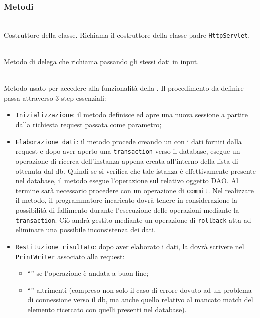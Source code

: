 \subsubsection*{Metodi}
\begin{description}
	\item{}\\
	Costruttore della classe. Richiama il costruttore della classe padre \texttt{HttpServlet}.
	
	\item{}\\
	Metodo di delega che richiama  passando gli stessi dati in input.
	
	\item{}\\
	Metodo usato per accedere alla funzionalità della . Il procedimento da definire passa attraverso 3 step essenziali:
	\begin{itemize}
		\item \texttt{Inizializzazione}: il metodo definisce ed apre una nuova sessione a partire dalla richiesta request passata come parametro;
		\item \texttt{Elaborazione dati}: il metodo procede creando un  con i dati forniti dalla request e dopo aver aperto una \texttt{transaction} verso il database, esegue un operazione di ricerca dell'instanza appena creata all'interno della lista di  ottenuta dal db. Quindi se si verifica che tale istanza è effettivamente presente nel database, il metodo esegue l'operazione  sul relativo oggetto DAO. Al termine sarà necessario procedere con un operazione di \texttt{commit}. Nel realizzare il metodo, il programmatore incaricato dovrà tenere in considerazione la possibilità di fallimento durante l'esecuzione delle operazioni mediante la \texttt{transaction}. Ciò andrà gestito mediante un operazione di \texttt{rollback} atta ad eliminare una possibile inconsistenza dei dati.
		\item \texttt{Restituzione risultato}: dopo aver elaborato i dati, la  dovrà scrivere nel \texttt{PrintWriter} associato alla request:
			\begin{itemize}
				\item ``'' se l'operazione è andata a buon fine;
				\item ``'' altrimenti (compreso non solo il caso di errore dovuto ad un problema di connessione verso il db, ma anche quello relativo al mancato match del elemento ricercato con quelli presenti nel database).
			\end{itemize}
	\end{itemize}

\end{description}


